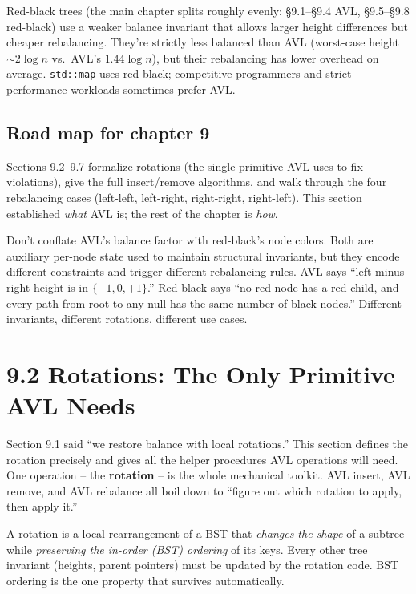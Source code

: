 \documentclass[11pt]{article}
\begin{document}
Red-black trees (the main chapter splits roughly evenly: \S9.1--\S9.4 AVL, \S9.5--\S9.8 red-black) use a weaker balance invariant that allows larger height differences but cheaper rebalancing. They're strictly less balanced than AVL (worst-case height $\sim 2 \log n$ vs.\ AVL's $1.44 \log n$), but their rebalancing has lower overhead on average. \texttt{std::map} uses red-black; competitive programmers and strict-performance workloads sometimes prefer AVL.

\subsection*{Road map for chapter 9}

Sections 9.2--9.7 formalize rotations (the single primitive AVL uses to fix violations), give the full insert/remove algorithms, and walk through the four rebalancing cases (left-left, left-right, right-right, right-left). This section established \emph{what} AVL is; the rest of the chapter is \emph{how}.

\begin{warnbox}
Don't conflate AVL's balance factor with red-black's node colors. Both are auxiliary per-node state used to maintain structural invariants, but they encode different constraints and trigger different rebalancing rules. AVL says ``left minus right height is in $\{-1, 0, +1\}$.'' Red-black says ``no red node has a red child, and every path from root to any null has the same number of black nodes.'' Different invariants, different rotations, different use cases.
\end{warnbox}

\section{9.2 Rotations: The Only Primitive AVL Needs}

Section 9.1 said ``we restore balance with local rotations.'' This section defines the rotation precisely and gives all the helper procedures AVL operations will need. One operation -- the \textbf{rotation} -- is the whole mechanical toolkit. AVL insert, AVL remove, and AVL rebalance all boil down to ``figure out which rotation to apply, then apply it.''

\begin{defnbox}[Rotation]
A rotation is a local rearrangement of a BST that \emph{changes the shape} of a subtree while \emph{preserving the in-order (BST) ordering} of its keys. Every other tree invariant (heights, parent pointers) must be updated by the rotation code. BST ordering is the one property that survives automatically.
\end{defnbox}
\end{document}
